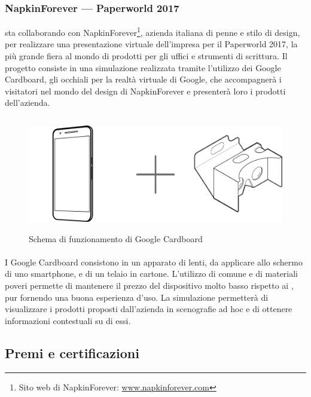    \subsubsection{NapkinForever --- Paperworld 2017}
   \nomeAzienda{} sta collaborando con NapkinForever\footnote{Sito web di NapkinForever: \href{www.napkinforever.com}{www.napkinforever.com}}, azienda italiana di penne e stilo di design, per realizzare una presentazione virtuale dell'impresa per il Paperworld 2017, la più grande fiera al mondo di prodotti per gli uffici e strumenti di scrittura. Il progetto consiste in una simulazione realizzata tramite l'utilizzo dei Google Cardboard, gli occhiali per la realtà virtuale di Google, che accompagnerà i visitatori nel mondo del design di NapkinForever e presenterà loro i prodotti dell'azienda.
   \begin{figure}[H]
      \begin{center}
         \includegraphics[width=15cm,height=5cm,keepaspectratio]{immagini/cardboard-schema}
      \end{center}
      \caption{Schema di funzionamento di Google Cardboard}\label{schemacardboard}
   \end{figure}
   \paragraph*{} I Google Cardboard consistono in un apparato di lenti, da applicare allo schermo di uno smartphone, e di un telaio in cartone. L'utilizzo di  comune e di materiali poveri permette di mantenere il prezzo del dispositivo molto basso rispetto ai , pur fornendo una buona esperienza d'uso. La simulazione permetterà di visualizzare i prodotti proposti dall'azienda in scenografie ad hoc e di ottenere informazioni contestuali su di essi.

   \subsection{Premi e certificazioni}

